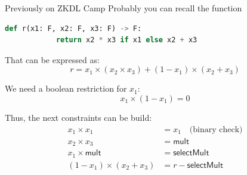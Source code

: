 \documentclass{zkdl-presentation-template}
\begin{document}
    \begin{frame}[fragile]{Previously on ZKDL Camp}
        Probably you can recall the function
        \begin{lstlisting}[language=Python,numbers=none]
        def r(x1: F, x2: F, x3: F) -> F:
            return x2 * x3 if x1 else x2 + x3
        \end{lstlisting}
        \vspace{-10pt}
         That can be expressed as:
        \begin{equation*}
            r = x_1 \times (x_2 \times x_3) + (1 - x_1) \times (x_2 + x_3)
        \end{equation*}

        \begin{alertblock}{}
            We need a boolean restriction for $x_1$:
            \vspace{-8pt}
            \begin{equation*}
                x_1 \times (1 - x_1) = 0
            \end{equation*}
        \end{alertblock}
        
        Thus, the next constraints can be build:
        \vspace{-5pt}
        \begin{align*}
            x_1 \times x_1 &= x_1 \quad \text{(binary check)} \tag{1} \\
            x_2 \times x_3 &= \mathsf{mult} \tag{2} \\
            x_1 \times \mathsf{mult} &= \mathsf{selectMult} \tag{3} \\
            (1 - x_1) \times (x_2 + x_3) &= r - \mathsf{selectMult} \tag{4}
        \end{align*}
    \end{frame}
\end{document}
